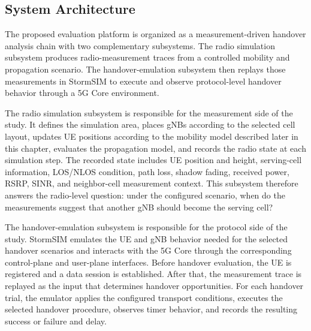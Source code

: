 \subsection{System Architecture}
The proposed evaluation platform is organized as a measurement-driven handover
analysis chain with two complementary subsystems. The radio simulation
subsystem produces radio-measurement traces from a controlled mobility and
propagation scenario. The handover-emulation subsystem then replays those
measurements in StormSIM to execute and observe protocol-level handover behavior
through a 5G Core environment.

The radio simulation subsystem is responsible for the measurement side of the
study. It defines the simulation area, places gNBs according to the selected
cell layout, updates UE positions according to the mobility model described
later in this chapter, evaluates the propagation model, and records the radio
state at each simulation step. The recorded state includes UE position and
height, serving-cell information, LOS/NLOS condition, path loss, shadow fading,
received power, RSRP, SINR, and neighbor-cell measurement context. This
subsystem therefore answers the radio-level question: under the configured
scenario, when do the measurements suggest that another gNB should become the
serving cell?

The handover-emulation subsystem is responsible for the protocol side of the
study. StormSIM emulates the UE and gNB behavior needed for the selected
handover scenarios and interacts with the 5G Core through the corresponding
control-plane and user-plane interfaces. Before handover evaluation, the UE is
registered and a data session is established. After that, the measurement trace
is replayed as the input that determines handover opportunities. For each
handover trial, the emulator applies the configured transport conditions,
executes the selected handover procedure, observes timer behavior, and records
the resulting success or failure and delay.

